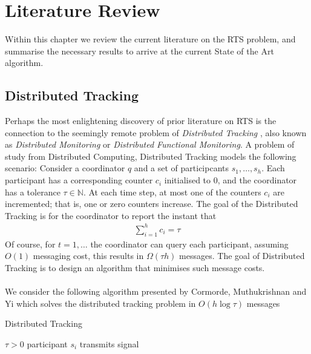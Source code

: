 \section{Literature Review}

Within this chapter we review the current literature on the RTS problem, and summarise the necessary results to arrive at the current State of the Art algorithm. 

\subsection{Distributed Tracking}

Perhaps the most enlightening discovery of prior literature on RTS is the connection to the seemingly remote problem of \textit{Distributed Tracking} \cite{Cormode2011}, also known as \textit{Distributed Monitoring} or \textit{Distributed Functional Monitoring}. A problem of study from Distributed Computing, Distributed Tracking models the following scenario: Consider a coordinator $q$ and a set of participcants $s_1, \dots, s_h$. Each participant has a corresponding counter $c_i$ initialised to 0, and the coordinator has a tolerance $\tau\in\mathbb{N}$. At each time step, at most one of the counters $c_i$ are incremented; that is, one or zero counters increase.  The goal of the Distributed Tracking is for the coordinator to report the instant that 
\begin{align}
    \sum_{i=1}^{h}c_i = \tau
\end{align}
Of course, for $t=1,\dots$ the coordinator can query each participant, assuming $O(1)$ messaging cost, this results in  $\Omega(\tau h)$ messages. The goal of Distributed Tracking is to design an algorithm that minimises such message costs. \\
\\
We consider the following algorithm presented by Cormorde, Muthukrishnan and Yi \cite{Cormode} which solves the distributed tracking problem in $O(h\log \tau)$ messages

\begin{algorithm}
\caption{Distributed Tracking }\label{Algorithm 1}
\begin{algorithmic}
\Require $\tau > 0$
    \State {}
    \State {} 
    \State {}
     
            \State participant $s_i$ transmits signal
        \EndIf
    \EndFor
\EndIf
\end{algorithmic}
\end{algorithm}


